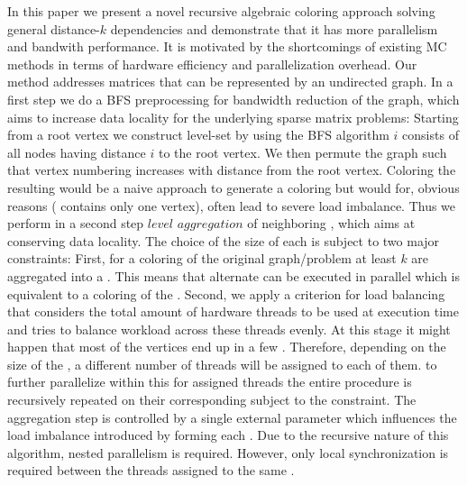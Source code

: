 In this paper we present a novel recursive algebraic coloring approach solving general distance-$k$ dependencies and demonstrate that it has more parallelism and bandwith performance. It is motivated by the shortcomings of existing \acrshort{MC} methods in terms of hardware efficiency and parallelization overhead. Our method addresses matrices that can be represented by an undirected graph. In a first step we do a \acrlong{BFS} preprocessing for bandwidth reduction of the graph, which aims to increase data locality for the underlying sparse matrix problems: Starting from a root vertex we construct level-set by using the \acrshort{BFS} algorithm \ie \level $i$ consists of all nodes having distance $i$ to the root vertex. We then permute the graph such that vertex numbering increases with distance from the root vertex. Coloring the resulting \levels would be a naive approach to generate a \DK coloring but would for, obvious reasons (\eg {} contains only one vertex), often lead to severe load imbalance. Thus we perform in a second step $level$ $aggregation$ of neighboring \levels, which aims at conserving data locality. The choice of the size of each \levelGroup is subject to two major constraints: First, for a \DK coloring of the original graph/problem at least $k$ \levels are aggregated into a \levelGroup. This means that alternate \levelGroups can be executed in parallel which is equivalent to a \DONE coloring of the \levelGroups. Second, we apply a criterion for load balancing that considers the total amount of hardware threads to be used at execution time and tries to balance workload across these threads evenly. At this stage it might happen that most of the vertices end up in a few \levelGroups. Therefore, depending on the size of the \levelGroups, a different number of threads will be assigned to each of them. \Inorder to further parallelize within this \levelGroup for assigned threads the entire procedure is recursively repeated on their corresponding \subgraphs subject to the \DK constraint. The aggregation step is controlled by a single external parameter which influences the load imbalance introduced by forming each \levelGroup. Due to the recursive nature of this algorithm, nested parallelism is required. However, only local synchronization is required between the threads assigned to the same \subgraph.


